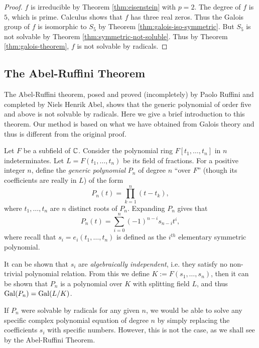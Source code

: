 \begin{proof}
	$f$ is irreducible by Theorem \ref{thm:eisenstein} with $p = 2$. The degree of $f$ is $5$, which is prime. Calculus shows that $f$ has three real zeros. Thus the Galois group of $f$ is isomorphic to $S_5$ by Theorem \ref{thm:galois-iso-symmetric}. But $S_5$ is not solvable by Theorem \ref{thm:symmetric-not-soluble}. Thus by Theorem \ref{thm:galois-theorem}, $f$ is not solvable by radicals.
\end{proof}

\subsection{The Abel-Ruffini Theorem}
The Abel-Ruffini theorem, posed and proved (incompletely) by Paolo Ruffini and completed by Niels Henrik Abel, shows that the generic polynomial of order five and above is not solvable by radicals. Here we give a brief introduction to this theorem. Our method is based on what we have obtained from Galois theory and thus is different from the original proof. 

\begin{definition}
	Let $F$ be a subfield of $\mathbb C$. Consider the polynomial ring $F[t_1, \dots, t_n]$ in $n$ indeterminates. Let $L = F(t_1, \dots, t_n)$ be its field of fractions. For a positive integer $n$, define the \textit{generic polynomial} $P_n$ of degree $n$ ``over $F$'' (though its coefficients are really in $L$) of the form
	$$
	P_n(t) = \prod_{k=1}^{n} (t - t_k),
	$$
	where $t_1, \dots, t_n $ are $n$ distinct roots of $P_n$. Expanding $P_n$ gives that 
	$$
	P_n(t) = \sum_{i=0}^{n} (-1)^{n - i} s_{n-i} t^i,
	$$
	where recall that $s_{i} = e_i(t_1,\dots,t_n)$ is defined as the $i^{th}$ elementary symmetric polynomial.
\end{definition}

It can be shown that $s_{i}$ are \textit{algebraically independent}, i.e. they satisfy no non-trivial polynomial relation. From this we define $K := F(s_1, \dots, s_n)$, then it can be shown that $P_n$ is a polynomial over $K$ with splitting field $L$, and thus $\operatorname{Gal}(P_n) = \operatorname{Gal}(L/K)$. 

If $P_n$ were solvable by radicals for any given $n$, we would be able to solve any specific complex polynomial equation of degree $n$ by simply replacing the coefficients $s_i$ with specific numbers. However, this is not the case, as we shall see by the Abel-Ruffini Theorem.




